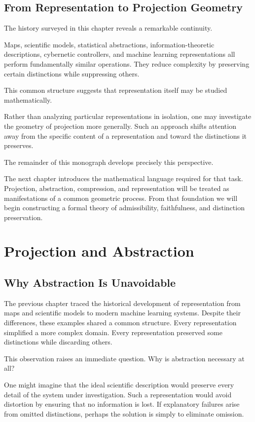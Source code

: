 \documentclass[11pt,oneside,openany]{book}
\begin{document}
\section{From Representation to Projection Geometry}

The history surveyed in this chapter reveals a remarkable continuity.

Maps, scientific models, statistical abstractions, information-theoretic descriptions, cybernetic controllers, and machine learning representations all perform fundamentally similar operations. They reduce complexity by preserving certain distinctions while suppressing others.

This common structure suggests that representation itself may be studied mathematically.

Rather than analyzing particular representations in isolation, one may investigate the geometry of projection more generally. Such an approach shifts attention away from the specific content of a representation and toward the distinctions it preserves.

The remainder of this monograph develops precisely this perspective.

The next chapter introduces the mathematical language required for that task. Projection, abstraction, compression, and representation will be treated as manifestations of a common geometric process. From that foundation we will begin constructing a formal theory of admissibility, faithfulness, and distinction preservation.

\chapter{Projection and Abstraction}

\section{Why Abstraction Is Unavoidable}

The previous chapter traced the historical development of representation from maps and scientific models to modern machine learning systems. Despite their differences, these examples shared a common structure. Every representation simplified a more complex domain. Every representation preserved some distinctions while discarding others.

This observation raises an immediate question. Why is abstraction necessary at all?

One might imagine that the ideal scientific description would preserve every detail of the system under investigation. Such a representation would avoid distortion by ensuring that no information is lost. If explanatory failures arise from omitted distinctions, perhaps the solution is simply to eliminate omission.
\end{document}
